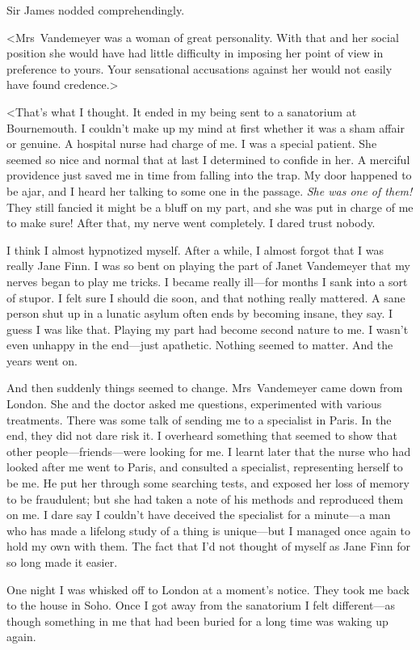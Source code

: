 Sir James nodded comprehendingly.

<Mrs~Vandemeyer was a woman of great personality. With that and her social position she would have had little difficulty in imposing her point of view in preference to yours. Your sensational accusations against her would not easily have found credence.>

<That's what I thought. It ended in my being sent to a sanatorium at Bournemouth. I couldn't make up my mind at first whether it was a sham affair or genuine. A hospital nurse had charge of me. I was a special patient. She seemed so nice and normal that at last I determined to confide in her. A merciful providence just saved me in time from falling into the trap. My door happened to be ajar, and I heard her talking to some one in the passage. \emph{She was one of them!} They still fancied it might be a bluff on my part, and she was put in charge of me to make sure! After that, my nerve went completely. I dared trust nobody.

I think I almost hypnotized myself. After a while, I almost forgot that I was really Jane Finn. I was so bent on playing the part of Janet Vandemeyer that my nerves began to play me tricks. I became really ill—for months I sank into a sort of stupor. I felt sure I should die soon, and that nothing really mattered. A sane person shut up in a lunatic asylum often ends by becoming insane, they say. I guess I was like that. Playing my part had become second nature to me. I wasn't even unhappy in the end—just apathetic. Nothing seemed to matter. And the years went on.

And then suddenly things seemed to change. Mrs~Vandemeyer came down from London. She and the doctor asked me questions, experimented with various treatments. There was some talk of sending me to a specialist in Paris. In the end, they did not dare risk it. I overheard something that seemed to show that other people—friends—were looking for me. I learnt later that the nurse who had looked after me went to Paris, and consulted a specialist, representing herself to be me. He put her through some searching tests, and exposed her loss of memory to be fraudulent; but she had taken a note of his methods and reproduced them on me. I dare say I couldn't have deceived the specialist for a minute—a man who has made a lifelong study of a thing is unique—but I managed once again to hold my own with them. The fact that I'd not thought of myself as Jane Finn for so long made it easier.

One night I was whisked off to London at a moment's notice. They took me back to the house in Soho. Once I got away from the sanatorium I felt different—as though something in me that had been buried for a long time was waking up again.

